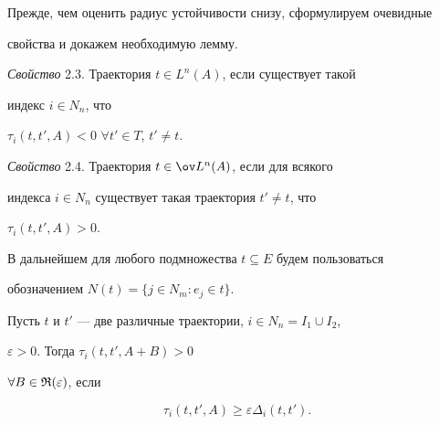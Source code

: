 Прежде, чем оценить радиус устойчивости снизу, сформулируем очевидные 


свойства и докажем необходимую лемму. 


\medskip 


 


{\it Свойство} 2.3. Траектория $t\in L^n(A)$, если существует такой 


индекс $i\in N_n$, что 


$\tau_i(t,t',A)<0$ $\forall t'\in T$, $t'\ne t$. 


\medskip 


 


{\it Свойство} 2.4. Траектория $t\in\ov L^n(A)$, если для всякого 


индекса $i\in N_n$ существует такая траектория $t'\ne t$, что 


$\tau_i(t,t',A)>0$. 


\medskip 


 


В дальнейшем для любого подмножества $t\subseteq E$ будем пользоваться 


обозначением $N(t)=\{j\in N_m:e_j\in t\}$. 


 


\begin{lems} 


Пусть $t$ и $t'$ --- две различные траектории, $i\in N_n=I_1\cup I_2$, 


$\varepsilon>0$. Тогда $\tau_i(t,t',A+B)>0$ 


$\forall B\in\frak R(\varepsilon)$, если 


\begin{equation} 


\tau_i(t,t',A)\ge\varepsilon\Delta_i(t,t'). 


\end{equation} 


\end{lems} 


 


